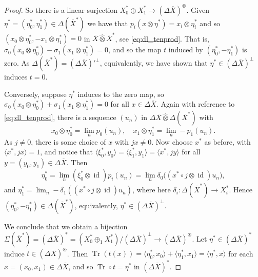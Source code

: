 \documentclass[a4paper,11pt]{article}
\theoremstyle{plain}
\theoremstyle{remark}
\newcommand{\ip}[2]{{\langle {#1} , {#2} \rangle}}
\newcommand{\id}{\operatorname{id}}
\newcommand{\proten}{\widehat\otimes}
\newcommand{\intdual}{\circledast}
\newcommand{\tr}{\operatorname{Tr}}
\begin{document}
\begin{proof}
So there is a linear surjection $X_0^* \oplus X_1^* \to (\Delta\overline X)^\intdual$.  Given $\eta^* = (\eta_0^*,\eta_1^*) \in \Delta(\overline X^*)$ we have that $p_i(x\otimes\eta^*) = x_i \otimes \eta_i^*$ and so $(x_0\otimes\eta_0^*, -x_1\otimes\eta_1^*) = 0$ in $\overline X \proten \overline X^*$, see \eqref{eq:dl_tenprod}.  That is, $\sigma_0(x_0\otimes\eta_0^*) - \sigma_1(x_1\otimes\eta_1^*) = 0$, and so the map $t$ induced by $(\eta_0^*, -\eta_1^*)$ is zero.  As 
$\Delta(\overline X^*) = (\Delta\overline X)'^\perp$, equivalently, we have shown that $\eta^* \in (\Delta\overline X)^\perp$ induces $t=0$.

Conversely, suppose $\eta^*$ induces to the zero map, so $\sigma_0(x_0\otimes\eta_0^*) + \sigma_1(x_1\otimes\eta_1^*) = 0$ for all $x\in\Delta\overline X$.  Again with reference to \eqref{eq:dl_tenprod}, there is a sequence $(u_n)$ in $\Delta\overline X \proten \Delta(\overline X^*)$ with
\[ x_0\otimes\eta_0^* = \lim_n p_0(u_n), \quad
x_1\otimes\eta_1^* = \lim_n -p_1(u_n). \]
As $j\not=0$, there is some choice of $x$ with $jx\not=0$.  Now choose $x^*$ as before, with $\ip{x^*}{jx} = 1$, and notice that $\ip{\xi_0^*}{y_0} = \ip{\xi_1^*}{y_1} = \ip{x^*}{jy}$ for all $y=(y_0,y_1)\in\Delta\overline X$.   Then
\[ \eta_0^* = \lim_n (\xi_0^*\otimes\id)p_i(u_n) = \lim_n \delta_0\big( (x^*\circ j\otimes\id)u_n \big), \]
and $\eta_1^* = \lim_n -\delta_1( (x^*\circ j\otimes\id)u_n )$, where here $\delta_i \colon \Delta(\overline X^*) \to X_i^*$.  Hence $(\eta_0^*, -\eta_1^*) \in \Delta(\overline X^*)$, equivalently, $\eta^* \in (\Delta\overline X)^\perp$.

We conclude that we obtain a bijection $\Sigma(\overline X^*) = (\Delta\overline X)^* = (X_0^* \oplus_1 X_1^*) / (\Delta\overline X)^\perp \to (\Delta\overline X)^\intdual$.  Let $\eta^*\in (\Delta\overline X)^*$ induce $t\in(\Delta\overline X)^\intdual$.  Then $\tr(t(x)) = \ip{\eta_0^*}{x_0} + \ip{\eta_1^*}{x_1} = \ip{\eta^*}{x}$ for each $x=(x_0,x_1)\in\Delta\overline X$, and so $\tr\circ t = \eta^*$ in $(\Delta\overline X)^*$.



\end{proof}
\end{document}
